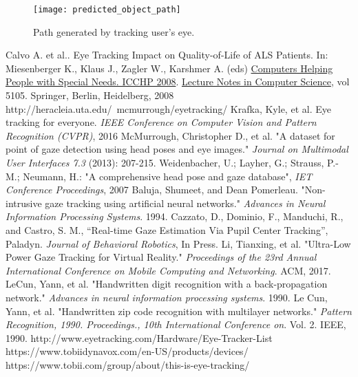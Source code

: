 \documentclass[10pt,twocolumn,letterpaper]{article}
\begin{document}
\begin{figure}
  \begin{center}
    \texttt{[image: predicted\_object\_path]}
  \end{center}
  \caption{Path generated by tracking user’s eye.}
  \label{fig:generatedpath}
\end{figure}



{\small


\begin{thebibliography}{1}
  Calvo A. et al.. Eye Tracking Impact on Quality-of-Life of ALS
  Patients. In: Miesenberger K., Klaus J., Zagler W., Karshmer
  A. (eds) \underline{Computers Helping People with Special Needs. ICCHP
    2008}. \underline{Lecture Notes in Computer Science}, vol 5105. Springer,
  Berlin, Heidelberg, 2008
  http://heracleia.uta.edu/~mcmurrough/eyetracking/
  Krafka, Kyle, et al. Eye tracking for everyone.
  \textit{IEEE Conference on Computer Vision and Pattern Recognition
    (CVPR)}, 2016
  McMurrough, Christopher D., et al. "A dataset for point of gaze
  detection using head poses and eye images."
  \textit{Journal on Multimodal User Interfaces 7.3} (2013): 207-215.
  Weidenbacher, U.; Layher, G.; Strauss, P.-M.; Neumann, H.: "A
  comprehensive head pose and gaze database",
  \textit{IET Conference Proceedings}, 2007
  Baluja, Shumeet, and Dean Pomerleau. "Non-intrusive gaze tracking
  using artificial neural networks." \textit{Advances in Neural
    Information Processing Systems}. 1994.
  Cazzato, D., Dominio, F., Manduchi, R., and Castro, S. M.,
  “Real-time Gaze Estimation Via Pupil Center Tracking”,
  Paladyn. \textit{Journal of Behavioral Robotics}, In Press.
  Li, Tianxing, et al. "Ultra-Low Power Gaze Tracking for Virtual
  Reality." \textit{Proceedings of the 23rd Annual International
    Conference on Mobile Computing and Networking}. ACM, 2017.
  LeCun, Yann, et al. "Handwritten digit recognition with a
  back-propagation network." \textit{Advances in neural information
    processing systems}. 1990.
  Le Cun, Yann, et al. "Handwritten zip code recognition with
  multilayer networks." \textit{Pattern Recognition,
    1990. Proceedings., 10th International Conference
    on}. Vol. 2. IEEE, 1990.
  http://www.eyetracking.com/Hardware/Eye-Tracker-List
  https://www.tobiidynavox.com/en-US/products/devices/
  https://www.tobii.com/group/about/this-is-eye-tracking/

\end{thebibliography}
}
\end{document}

